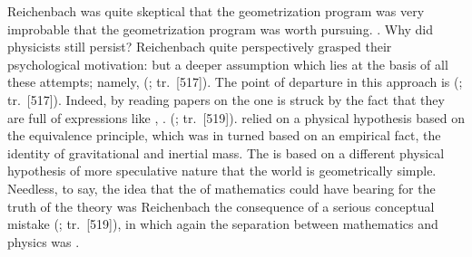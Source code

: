 \documentclass[draft]{article}
\renewcommand{\rzlap}[2]{(\cite[#1]{Reichenbach1928}; tr.\ [#2])\xspace}
\begin{document}
Reichenbach was quite skeptical that the geometrization program was very improbable that the geometrization program was worth pursuing. . Why did physicists still persist? Reichenbach quite perspectively grasped their psychological motivation:  but a deeper assumption which lies at the basis of all these attempts; namely,  \rzlap{370}{517}. The point of departure in this approach is  \rzlap{370}{517}. Indeed, by reading papers on the \uft one is struck by the fact that they are full of expressions like , \etc.  \rzlap{372}{519}. \Gr relied on a physical hypothesis based on the equivalence principle, which was in turned based on an empirical fact, the identity of gravitational and inertial mass. The \uftp is based on a different physical hypothesis of more speculative nature that the world is geometrically simple. Needless, to say, the idea that the  of mathematics could have bearing for the truth of the theory was Reichenbach the consequence of a serious conceptual mistake \rzlap{372}{519}, in which again the separation between mathematics and physics was .


\end{document}
